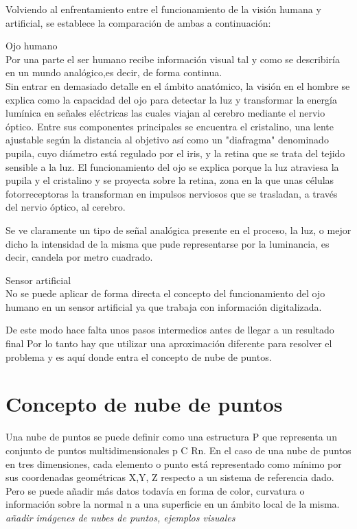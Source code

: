 
Volviendo al enfrentamiento entre el funcionamiento de la visión humana y artificial, se establece la comparación de ambas a continuación:

\begin{list}{•}
\item Ojo humano
\\
Por una parte el ser humano recibe información visual tal y como se describiría en un mundo analógico,es decir, de forma continua.
\\
Sin entrar en demasiado detalle en el ámbito anatómico, la visión en el hombre se explica como la capacidad del ojo para detectar la luz y transformar la energía lumínica en señales eléctricas las cuales viajan al cerebro mediante el nervio óptico. Entre sus componentes principales se encuentra el cristalino, una lente ajustable según la distancia al objetivo así como un "diafragma" denominado pupila, cuyo diámetro está regulado por el iris, y la retina que se trata del tejido sensible a la luz. 
El funcionamiento del ojo se explica porque la luz atraviesa la pupila y el cristalino y se proyecta sobre la retina, zona en la que unas células fotorreceptoras la transforman en impulsos nerviosos que se trasladan, a través del nervio óptico, al cerebro.

Se ve claramente un tipo de señal analógica presente en el proceso, la luz, o mejor dicho la intensidad de la misma que pude representarse por la luminancia, es decir, candela por metro cuadrado.


\item Sensor artificial
\\
No se puede aplicar de forma directa el concepto del funcionamiento del ojo humano en un sensor artificial ya que trabaja con información digitalizada. 

De este modo hace falta unos pasos intermedios antes de llegar a un resultado final Por lo tanto hay que utilizar una aproximación diferente para resolver el problema y es aquí donde entra el concepto de nube de puntos. 
\end{list}

\section{Concepto de nube de puntos}
Una nube de puntos se puede definir como una estructura P que representa un conjunto de puntos multidimensionales p C Rn. En el caso de una nube de puntos en tres dimensiones, cada elemento o punto está representado como mínimo por sus coordenadas geométricas X,Y, Z respecto a un sistema de referencia dado. Pero se puede añadir más datos todavía en forma de color, curvatura o información sobre la normal n a una superficie en un ámbito local de la misma.  
\textit{añadir imágenes de nubes de puntos, ejemplos visuales}

